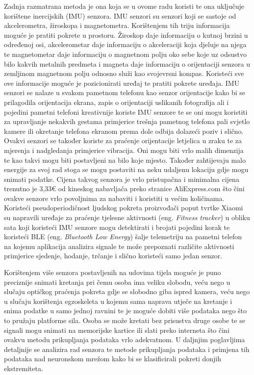 \documentclass[times, utf8, diplomski]{fer}
\begin{document}
Zadnja razmatrana metoda je ona koja se u ovome radu koristi te ona uključuje korištene inercijskih (IMU) senzora. IMU senzori su
senzori koji se sastoje od akcelerometra, žiroskopa i magnetometra. Korištenjem tih triju informacija moguće je pratiti pokrete u
prostoru. Žiroskop daje informaciju o kutnoj brzini u određenoj osi, akcelerometar daje informaciju o akceleraciji koja djeluje na njega
te magnetometar daje informaciju o magnetnom polju oko sebe koje uz odsustvo bilo kakvih metalnih predmeta i magneta daje informaciju
o orijentaciji senzora u zemljinom magnetnom polju odnosno služi kao svojevrsni kompas. Koristeći sve ove informacije moguće je
pozicionirati uređaj te pratiti pokrete uređaja. IMU senzori se nalaze u svakom pametnom telefonu kao senzor orijentacije kako bi se
prilagodila orijentacija ekrana, zapis o orijentaciji uslikanih fotografija ali i pojedini pametni telefoni kreativnije koriste IMU
senzore te se oni mogu koristiti za upravljanje nekakvih gestama primjerice trešnja pametnog telefona pali svjetlo kamere ili
okretanje telefona ekranom prema dole odbija dolazeći poziv i slično. Ovakvi senzori se također koriste za praćenje orijentacije
letjelica u zraku te za mjerenja i nadgledanja primjerice vibracija. Oni mogu biti vrlo
malih dimenzija te kao takvi mogu biti postavljeni na bilo koje mjesto. Također zahtijevaju malo energije za svoj rad stoga se mogu
postaviti na neku udaljenu lokaciju gdje mogu snimati podatke. Cijena takvog senzora je vrlo pristupačna i minimalna cijena trenutno
je 3,33€ od kineskog nabavljača preko stranice AliExpress.com što čini ovakve senzore vrlo povoljnima za nabaviti i koristiti u
većim količinama. Koristeći pseudoperiodičnost ljudskog pokreta proizvođači poput tvrtke Xiaomi su napravili uređaje za praćenje
tjelesne aktivnosti (eng. \textit{Fitness tracker}) u obliku sata koji koristeći IMU senzore mogu detektirati i brojati pojedini korak 
te koristeći BLE (eng. \textit{Bluetooth Low Energy}) šalje telemetriju na pametni telefon na kojemu aplikacija analizira signale
te može prepoznati različite aktivnosti primjerice sjedenje, hodanje, trčanje i slično koristeći samo jedan senzor.

Korištenjem više senzora postavljenih na udovima tijela moguće je puno preciznije snimati kretanja pri čemu osoba ima veliku slobodu,
veću nego u slučaju optičkog praćenja pokreta gdje se slobodno giba ispred kamera, veću nego u slučaju korištenja egzoskeleta u
kojemu sama naprava utječe na kretanje i snima podatke u samo jednoj ravnini te je moguće dobiti više podataka nego što to pružaju
platforme sila. Osoba se može kretati bez prisustva druge osobe te se signali mogu snimati na memorijske kartice ili slati preko
interneta što čini ovakvu metodu prikupljanja podataka vrlo adekvatnom. U daljnjim poglavljima detaljnije se analizira
rad senzora te metode prikupljanja podataka i primjena tih podataka nad neuronskom mrežom kako bi se klasificirali pokreti donjih
ekstremiteta.
\end{document}
